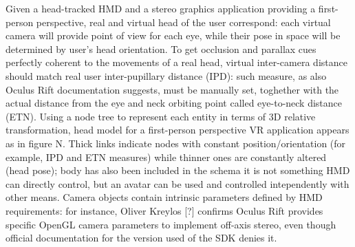 Given a head-tracked HMD and a stereo graphics application providing a first-person perspective, real and virtual head of the user correspond: each virtual camera will provide point of view for each eye, while their pose in space will be determined by user's head orientation. To get occlusion and parallax cues perfectly coherent to the movements of a real head, virtual inter-camera distance should match real user inter-pupillary distance (IPD): such measure, as also Oculus Rift documentation suggests, must be manually set, toghether with the actual distance from the eye and neck orbiting point called eye-to-neck distance (ETN). Using a node tree to represent each entity in terms of 3D relative transformation, head model for a first-person perspective VR application appears as in figure N. Thick links indicate nodes with constant position/orientation (for example, IPD and ETN measures) while thinner ones are constantly altered (head pose); body has also been included in the schema it is not something HMD can directly control, but an avatar can be used and controlled intependently with other means. Camera objects contain intrinsic parameters defined by HMD requirements: for instance, Oliver Kreylos [?] confirms Oculus Rift provides specific OpenGL camera parameters to implement off-axis stereo, even though official documentation for the version used of the SDK denies it.

